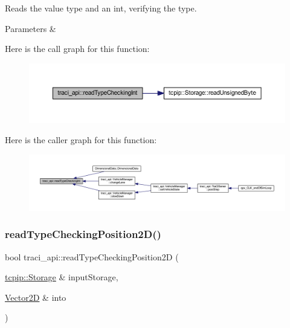 Reads the value type and an int, verifying the type. 


\begin{DoxyParams}{Parameters}
{\em } & \\
\hline
\end{DoxyParams}
Here is the call graph for this function\+:\nopagebreak
\begin{figure}[H]
\begin{center}
\leavevmode
\includegraphics[width=350pt]{namespacetraci__api_a57c1a8583619eb1e9984249249435f8e_cgraph}
\end{center}
\end{figure}
Here is the caller graph for this function\+:\nopagebreak
\begin{figure}[H]
\begin{center}
\leavevmode
\includegraphics[width=350pt]{namespacetraci__api_a57c1a8583619eb1e9984249249435f8e_icgraph}
\end{center}
\end{figure}
\mbox{\label{namespacetraci__api_a26421201e19b2667e198708c2216ca06}} 
\subsubsection{\texorpdfstring{read\+Type\+Checking\+Position2\+D()}{readTypeCheckingPosition2D()}}
{\footnotesize\ttfamily bool traci\+\_\+api\+::read\+Type\+Checking\+Position2D (\begin{DoxyParamCaption}\item[{\hyperlink{classtcpip_1_1_storage}{tcpip\+::\+Storage} \&}]{input\+Storage,  }\item[{\hyperlink{class_vector2_d}{Vector2D} \&}]{into }\end{DoxyParamCaption})}




